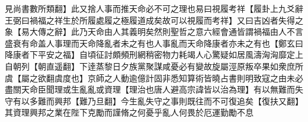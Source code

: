 見尚書數所類翻】此又捨人事而推天命必不可之理也易曰視履考祥【履卦上九爻辭王弼曰禍福之祥生於所履處履之極履道成矣故可以視履而考祥】又曰吉凶者失得之象【易大傳之辭】此乃天命由人其義明矣然則聖哲之意六經會通皆謂禍福由人不言盛衰有命盖人事理而天命降亂者未之有也人事亂而天命降康者亦未之有也【鄭玄曰降康者下平安之福】自頃征討頗頻刑網稍密物力耗竭人心驚疑如居風濤洶洶靡定上自朝列【朝直遥翻】下逹蒸黎日夕族黨聚謀咸憂必有變故旋屬涇原叛卒果如衆庶所虞【屬之欲翻虞度也】京師之人動逾億計固非悉知算術皆曉占書則明致寇之由未必盡關天命臣聞理或生亂亂或資理【理治也唐人避高宗諱皆以治為理】有以無難而失守有以多難而興邦【難乃旦翻】今生亂失守之事則既往而不可復追矣【復扶又翻】其資理興邦之業在陛下克勵而謹脩之何憂乎亂人何畏於厄運勤勵不息
